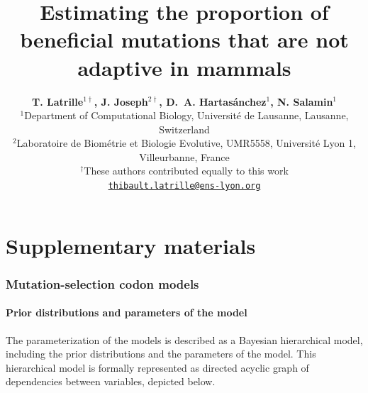 \documentclass{article}
\title{\textbf{Estimating the proportion of beneficial mutations that are not adaptive in mammals}}
\author{
    \large
    \textbf{T. {Latrille}$^{1\dag}$\orcidlink{0000-0002-9643-4668}, J. {Joseph}$^{2\dag}$\orcidlink{0009-0002-1312-9930}, D.~A. {Hartasánchez}$^{1}$\orcidlink{0000-0003-2596-6883}, N. {Salamin}$^{1}$\orcidlink{0000-0002-3963-4954}}\\
    \scriptsize $^{1}$Department of Computational Biology, Université de Lausanne, Lausanne, Switzerland\\
    \scriptsize $^{2}$Laboratoire de Biométrie et Biologie Evolutive, UMR5558, Université Lyon 1, Villeurbanne, France \\
    \scriptsize $^{\dag}$These authors contributed equally to this work\\
    \normalsize \texttt{\href{mailto:thibault.latrille@ens-lyon.org}{thibault.latrille@ens-lyon.org}} \\
}
\date{}
\begin{document}
    \maketitle
    \part*{Supplementary materials}
    \tableofcontents

    \newpage
    \listoffigures

    \newpage
    \listoftables

    \clearpage
    \section{Mutation-selection codon models}\label{sec:mutsel}

    \subsection{Prior distributions and parameters of the model}\label{subsec:priors}

    The parameterization of the models is described as a Bayesian hierarchical model, including the prior distributions and the parameters of the model.
    This hierarchical model is formally represented as directed acyclic graph of dependencies between variables, depicted below.
\end{document}
